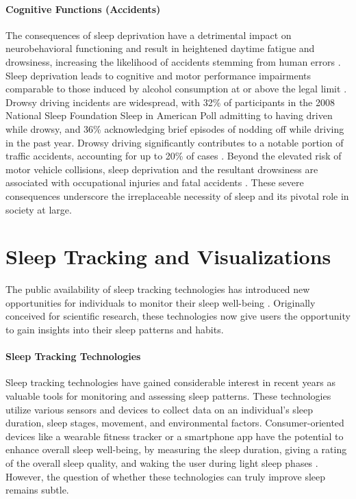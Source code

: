 \documentclass[
  a4paper,  %
  twoside,  %
  bibliography=totoc,
  headsepline,
  cleardoublepage=empty,
  parskip=half,
  draft=false
]{scrbook}
\begin{document}
\paragraph{Cognitive Functions (Accidents)}
The consequences of sleep deprivation have a detrimental impact on neurobehavioral functioning \cite{durmer2005neurocognitive,lim2008sleep,lim2010meta} and result in heightened daytime fatigue and drowsiness, increasing the likelihood of accidents stemming from human errors \cite{axelsson2008sleepiness, dinges1995overview}. Sleep deprivation leads to cognitive and motor performance impairments comparable to those induced by alcohol consumption at or above the legal limit \cite{williamson2011link}. Drowsy driving incidents are widespread, with 32\% of participants in the 2008 National Sleep Foundation Sleep in American Poll admitting to having driven while drowsy, and 36\% acknowledging brief episodes of nodding off while driving in the past year. Drowsy driving significantly contributes to a notable portion of traffic accidents, accounting for up to 20\% of cases \cite{williamson2000moderate}. Beyond the elevated risk of motor vehicle collisions, sleep deprivation and the resultant drowsiness are associated with occupational injuries and fatal accidents \cite{connor2001role, aakerstedt2002prospective}. These severe consequences underscore the irreplaceable necessity of sleep and its pivotal role in society at large.

\section{Sleep Tracking and Visualizations}
The public availability of sleep tracking technologies has introduced new opportunities for individuals to monitor their sleep well-being \cite{Challenges_Oppotunieties_SleepTracking}. Originally conceived for scientific research, these technologies now give users the opportunity to gain insights into their sleep patterns and habits.
\paragraph{Sleep Tracking Technologies}
Sleep tracking technologies have gained considerable interest in recent years as valuable tools for monitoring and assessing sleep patterns. These technologies utilize various sensors and devices to collect data on an individual's sleep duration, sleep stages, movement, and environmental factors. Consumer-oriented devices like a wearable fitness tracker or a smartphone app have the potential to enhance overall sleep well-being, by measuring the sleep duration, giving a rating of the overall sleep quality, and waking the user during light sleep phases \cite{Consumer_SleepTracking}. However, the question of whether these technologies can truly improve sleep remains subtle.
\end{document}
